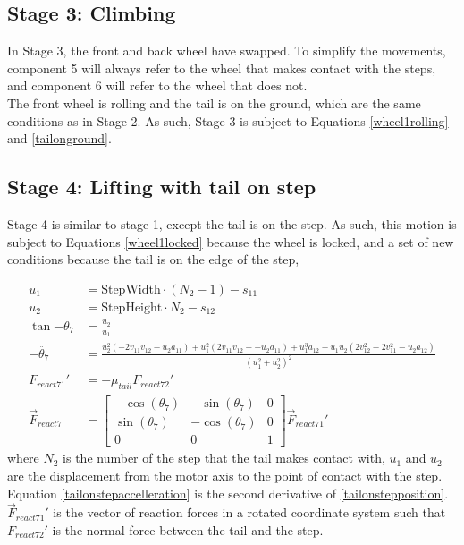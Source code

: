 \subsection*{Stage 3: Climbing}

In Stage 3, the front and back wheel have swapped. To simplify the movements, component 5 will always refer to the wheel that makes contact with the steps, and component 6 will refer to the wheel that does not. \\
The front wheel is rolling and the tail is on the ground, which are the same conditions as in Stage 2. As such, Stage 3 is subject to Equations \ref{wheel1rolling} and \ref{tailonground}.

\subsection*{Stage 4: Lifting with tail on step}
Stage 4 is similar to stage 1, except the tail is on the step. As such, this motion is subject to Equations \ref{wheel1locked} because the wheel is locked, and a set of new conditions because the tail is on the edge of the step,

\begin{subequations}
	\label{tailonstep}
	\begin{align}
		u_1 &= \mathrm{StepWidth}\cdot (N_2-1)- s_{11}\\
		u_2 &= \mathrm{StepHeight}\cdot N_2 - s_{12}\\
		\tan{-\theta_7} &= \frac{u_2}{u_1}\\
		\label{tailonstepposition}
		-\ddot{\theta_7} &= \frac{u_2^2 (-2  v_{11}  v_{12} - u_2  a_{11}) + u_1^2 (2  v_{11}  v_{12} + -u_2 a_{11}) + u_1^3  a_{12} - u_1  u_2  (2 v_{12}^2 - 2  v_{11}^2 - u_2  a_{12})}{(u_1^2 + u_2^2)^2}\\
		\label{tailonstepaccelleration}
		F_{react71}' &= -\mu_{tail} F_{react72}'\\
		\vec{F}_{react7} &= \begin{bmatrix}
			-\cos{(\theta_7)} & -\sin{(\theta_7)} & 0\\
			\sin{(\theta_7)} & -\cos{(\theta_7)} & 0\\
			0 & 0 & 1
		\end{bmatrix} \vec{F}_{react71}'
	\end{align}
\end{subequations}
where $N_2$ is the number of the step that the tail makes contact with, $u_1$ and $u_2$ are the displacement from the motor axis to the point of contact with the step. Equation \ref{tailonstepaccelleration} is the second derivative of \ref{tailonstepposition}. $\vec{F}_{react71}'$ is the vector of reaction forces in a rotated coordinate system such that $F_{react72}'$ is the normal force between the tail and the step.


